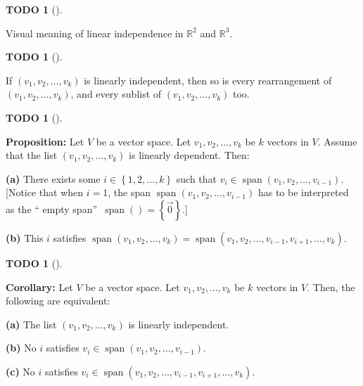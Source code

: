 \documentclass[numbers=enddot,12pt,final,onecolumn,notitlepage]{scrartcl}%
\theoremstyle{definition}
\newtheorem{quest}[theo]{TODO}
\newenvironment{todo}[1][]
{\begin{quest}[#1]\begin{leftbar}}
{\end{leftbar}\end{quest}}
\begin{document}
\begin{todo}
Visual meaning of linear independence in $\mathbb{R}^{2}$ and $\mathbb{R}^{3}$.
\end{todo}

\begin{todo}
If $\left(  v_{1},v_{2},\ldots,v_{k}\right)  $ is linearly independent, then
so is every rearrangement of $\left(  v_{1},v_{2},\ldots,v_{k}\right)  $, and
every sublist of $\left(  v_{1},v_{2},\ldots,v_{k}\right)  $ too.
\end{todo}

\begin{todo}
\textbf{Proposition:} Let $V$ be a vector space. Let $v_{1},v_{2},\ldots
,v_{k}$ be $k$ vectors in $V$. Assume that the list $\left(  v_{1}%
,v_{2},\ldots,v_{k}\right)  $ is linearly dependent. Then:

\textbf{(a)} There exists some $i\in\left\{  1,2,\ldots,k\right\}  $ such that
$v_{i}\in\operatorname*{span}\left(  v_{1},v_{2},\ldots,v_{i-1}\right)  $.
[Notice that when $i=1$, the span $\operatorname*{span}\left(  v_{1}%
,v_{2},\ldots,v_{i-1}\right)  $ has to be interpreted as the \textquotedblleft
empty span\textquotedblright\ $\operatorname*{span}\left(  {}\right)
=\left\{  \overrightarrow{0}\right\}  $.]

\textbf{(b)} This $i$ satisfies $\operatorname*{span}\left(  v_{1}%
,v_{2},\ldots,v_{k}\right)  =\operatorname*{span}\left(  v_{1},v_{2}%
,\ldots,v_{i-1},v_{i+1},\ldots,v_{k}\right)  $.
\end{todo}

\begin{todo}
\textbf{Corollary:} Let $V$ be a vector space. Let $v_{1},v_{2},\ldots,v_{k}$
be $k$ vectors in $V$. Then, the following are equivalent:

\textbf{(a)} The list $\left(  v_{1},v_{2},\ldots,v_{k}\right)  $ is linearly independent.

\textbf{(b)} No $i$ satisfies $v_{i}\in\operatorname*{span}\left(  v_{1}%
,v_{2},\ldots,v_{i-1}\right)  $.

\textbf{(c)} No $i$ satisfies $v_{i}\in\operatorname*{span}\left(  v_{1}%
,v_{2},\ldots,v_{i-1},v_{i+1},\ldots,v_{k}\right)  $.
\end{todo}
\end{document}
